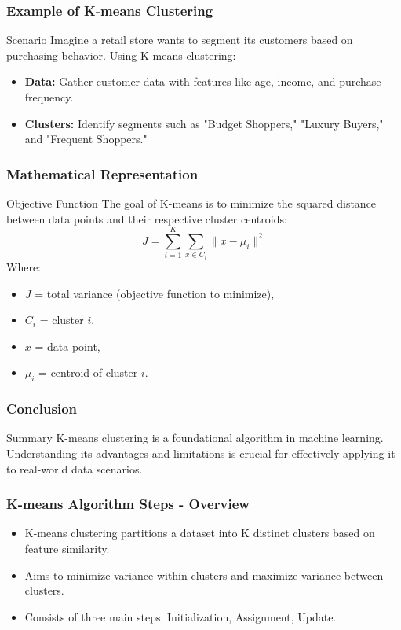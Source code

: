 \documentclass[aspectratio=169]{beamer}
\begin{document}
\begin{frame}[fragile]
    \frametitle{Example of K-means Clustering}
    \begin{block}{Scenario}
        Imagine a retail store wants to segment its customers based on purchasing behavior. Using K-means clustering:
    \end{block}
    \begin{itemize}
        \item \textbf{Data:} Gather customer data with features like age, income, and purchase frequency.
        \item \textbf{Clusters:} Identify segments such as "Budget Shoppers," "Luxury Buyers," and "Frequent Shoppers."
    \end{itemize}
\end{frame}

\begin{frame}[fragile]
    \frametitle{Mathematical Representation}
    \begin{block}{Objective Function}
        The goal of K-means is to minimize the squared distance between data points and their respective cluster centroids:
        \begin{equation}
            J = \sum_{i=1}^{K} \sum_{x \in C_i} \|x - \mu_i\|^2
        \end{equation}
        Where:
        \begin{itemize}
            \item \(J\) = total variance (objective function to minimize),
            \item \(C_i\) = cluster \(i\),
            \item \(x\) = data point,
            \item \(\mu_i\) = centroid of cluster \(i\).
        \end{itemize}
    \end{block}
\end{frame}

\begin{frame}[fragile]
    \frametitle{Conclusion}
    \begin{block}{Summary}
        K-means clustering is a foundational algorithm in machine learning. Understanding its advantages and limitations is crucial for effectively applying it to real-world data scenarios.
    \end{block}
\end{frame}

\begin{frame}[fragile]
    \frametitle{K-means Algorithm Steps - Overview}
    \begin{itemize}
        \item K-means clustering partitions a dataset into K distinct clusters based on feature similarity.
        \item Aims to minimize variance within clusters and maximize variance between clusters.
        \item Consists of three main steps: Initialization, Assignment, Update.
    \end{itemize}
\end{frame}
\end{document}
